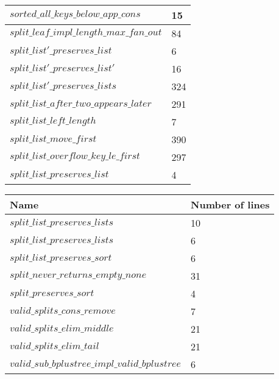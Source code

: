 \begin{tabular}{| l | l |}
$sorted\_all\_keys\_below\_app\_cons$ & 15 \\ \hline
$split\_leaf\_impl\_length\_max\_fan\_out$ & 84 \\ \hline
$split\_list'\_preserves\_list$ & 6 \\ \hline
$split\_list'\_preserves\_list'$ & 16 \\ \hline
$split\_list'\_preserves\_lists$ & 324 \\ \hline
$split\_list\_after\_two\_appears\_later$ & 291 \\ \hline
$split\_list\_left\_length$ & 7 \\ \hline
$split\_list\_move\_first$ & 390 \\ \hline
$split\_list\_overflow\_key\_le\_first$ & 297 \\ \hline
$split\_list\_preserves\_list$ & 4 \\ \hline
\end{tabular}
\newpage
\begin{tabular}{| l | l |}
\hline
Name & Number of lines \\ \hline
$split\_list\_preserves\_lists$ & 10 \\ \hline
$split\_list\_preserves\_lists$ & 6 \\ \hline
$split\_list\_preserves\_sort$ & 6 \\ \hline
$split\_never\_returns\_empty\_none$ & 31 \\ \hline
$split\_preserves\_sort$ & 4 \\ \hline
$valid\_splits\_cons\_remove$ & 7 \\ \hline
$valid\_splits\_elim\_middle$ & 21 \\ \hline
$valid\_splits\_elim\_tail$ & 21 \\ \hline
$valid\_sub\_bplustree\_impl\_valid\_bplustree$ & 6 \\ \hline

\end{tabular}
